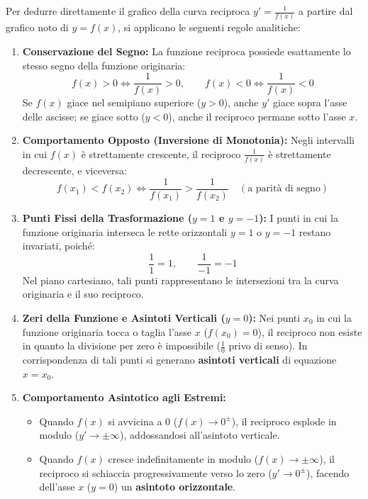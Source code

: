 \documentclass[11pt,a4paper,oneside]{report}
\begin{document}
\begin{metodo}
Per dedurre direttamente il grafico della curva reciproca $y' = \frac{1}{f(x)}$ a partire dal grafico noto di $y = f(x)$, si applicano le seguenti regole analitiche:
\begin{enumerate}[leftmargin=2em]
    \item \textbf{Conservazione del Segno:} La funzione reciproca possiede esattamente lo stesso segno della funzione originaria:
    \begin{equation}
        f(x) > 0 \iff \frac{1}{f(x)} > 0, \qquad f(x) < 0 \iff \frac{1}{f(x)} < 0
    \end{equation}
    Se $f(x)$ giace nel semipiano superiore ($y > 0$), anche $y'$ giace sopra l'asse delle ascisse; se giace sotto ($y < 0$), anche il reciproco permane sotto l'asse $x$.
    
    \item \textbf{Comportamento Opposto (Inversione di Monotonia):} Negli intervalli in cui $f(x)$ \`e strettamente crescente, il reciproco $\frac{1}{f(x)}$ \`e strettamente decrescente, e viceversa:
    \begin{equation}
        f(x_1) < f(x_2) \iff \frac{1}{f(x_1)} > \frac{1}{f(x_2)} \quad (\text{a parit\`a di segno})
    \end{equation}
    
    \item \textbf{Punti Fissi della Trasformazione ($y = 1$ e $y = -1$):} I punti in cui la funzione originaria interseca le rette orizzontali $y = 1$ o $y = -1$ restano invariati, poich\'e:
    \begin{equation}
        \frac{1}{1} = 1, \qquad \frac{1}{-1} = -1
    \end{equation}
    Nel piano cartesiano, tali punti rappresentano le intersezioni tra la curva originaria e il suo reciproco.
    
    \item \textbf{Zeri della Funzione e Asintoti Verticali ($y = 0$):} Nei punti $x_0$ in cui la funzione originaria tocca o taglia l'asse $x$ ($f(x_0) = 0$), il reciproco non esiste in quanto la divisione per zero \`e impossibile ($\frac{1}{0}$ privo di senso). In corrispondenza di tali punti si generano \textbf{asintoti verticali} di equazione $x = x_0$.
    
    \item \textbf{Comportamento Asintotico agli Estremi:}
    \begin{itemize}
        \item Quando $f(x)$ si avvicina a $0$ ($f(x) \to 0^{\pm}$), il reciproco esplode in modulo ($y' \to \pm\infty$), addossandosi all'asintoto verticale.
        \item Quando $f(x)$ cresce indefinitamente in modulo ($f(x) \to \pm\infty$), il reciproco si schiaccia progressivamente verso lo zero ($y' \to 0^{\pm}$), facendo dell'asse $x$ ($y = 0$) un \textbf{asintoto orizzontale}.
    \end{itemize}
\end{enumerate}
\end{metodo}
\end{document}
